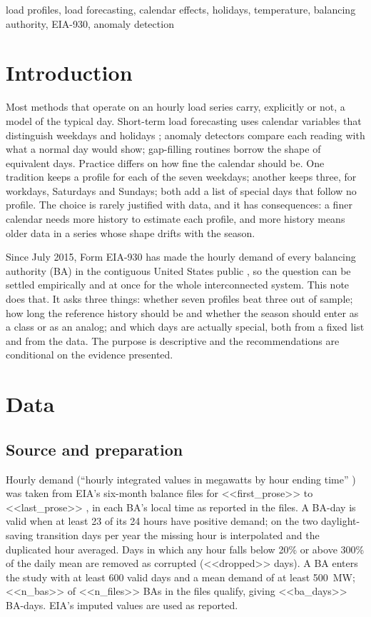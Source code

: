 \documentclass[conference]{IEEEtran}
\begin{document}
\begin{IEEEkeywords}
load profiles, load forecasting, calendar effects, holidays, temperature, balancing authority, EIA-930, anomaly detection
\end{IEEEkeywords}

\section{Introduction}
Most methods that operate on an hourly load series carry, explicitly or not, a model of the typical day. Short-term load forecasting uses calendar variables that distinguish weekdays and holidays \cite{hong2016review,taylor2003double}; anomaly detectors compare each reading with what a normal day would show; gap-filling routines borrow the shape of equivalent days. Practice differs on how fine the calendar should be. One tradition keeps a profile for each of the seven weekdays; another keeps three, for workdays, Saturdays and Sundays; both add a list of special days that follow no profile. The choice is rarely justified with data, and it has consequences: a finer calendar needs more history to estimate each profile, and more history means older data in a series whose shape drifts with the season.

Since July 2015, Form EIA-930 has made the hourly demand of every balancing authority (BA) in the contiguous United States public \cite{eia930monitor}, so the question can be settled empirically and at once for the whole interconnected system. This note does that. It asks three things: whether seven profiles beat three out of sample; how long the reference history should be and whether the season should enter as a class or as an analog; and which days are actually special, both from a fixed list and from the data. The purpose is descriptive and the recommendations are conditional on the evidence presented.

\section{Data}
\subsection{Source and preparation}
Hourly demand (``hourly integrated values in megawatts by hour ending time'' \cite{eia930instructions}) was taken from EIA's six-month balance files for <<first_prose>> to <<last_prose>> \cite{eia930monitor}, in each BA's local time as reported in the files. A BA-day is valid when at least 23 of its 24 hours have positive demand; on the two daylight-saving transition days per year the missing hour is interpolated and the duplicated hour averaged. Days in which any hour falls below 20\% or above 300\% of the daily mean are removed as corrupted (<<dropped>> days). A BA enters the study with at least 600 valid days and a mean demand of at least 500~MW; <<n_bas>> of <<n_files>> BAs in the files qualify, giving <<ba_days>> BA-days. EIA's imputed values are used as reported.
\end{document}
